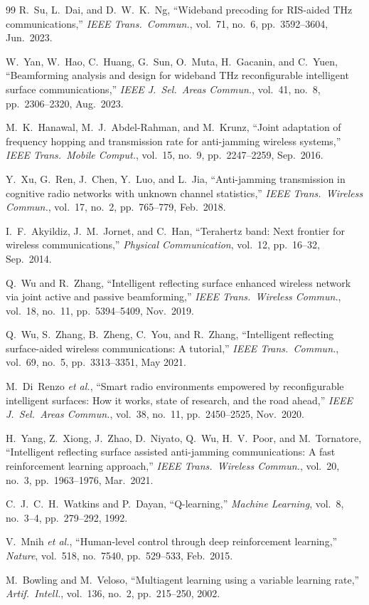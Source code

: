 \documentclass[10pt,conference]{IEEEtran}
\begin{document}
\balance
\begin{thebibliography}{99}
R.~Su, L.~Dai, and D.~W.~K.~Ng,
``Wideband precoding for RIS-aided THz communications,''
\emph{IEEE Trans.\ Commun.}, vol.~71, no.~6, pp.~3592--3604, Jun.\ 2023.

W.~Yan, W.~Hao, C.~Huang, G.~Sun, O.~Muta, H.~Gacanin, and C.~Yuen,
``Beamforming analysis and design for wideband THz reconfigurable intelligent surface communications,''
\emph{IEEE J.\ Sel.\ Areas Commun.}, vol.~41, no.~8, pp.~2306--2320, Aug.\ 2023.

M.~K.~Hanawal, M.~J.~Abdel-Rahman, and M.~Krunz,
``Joint adaptation of frequency hopping and transmission rate for anti-jamming wireless systems,''
\emph{IEEE Trans.\ Mobile Comput.}, vol.~15, no.~9, pp.~2247--2259, Sep.\ 2016.

Y.~Xu, G.~Ren, J.~Chen, Y.~Luo, and L.~Jia,
``Anti-jamming transmission in cognitive radio networks with unknown channel statistics,''
\emph{IEEE Trans.\ Wireless Commun.}, vol.~17, no.~2, pp.~765--779, Feb.\ 2018.

I.~F.~Akyildiz, J.~M.~Jornet, and C.~Han,
``Terahertz band: Next frontier for wireless communications,''
\emph{Physical Communication}, vol.~12, pp.~16--32, Sep.\ 2014.

Q.~Wu and R.~Zhang,
``Intelligent reflecting surface enhanced wireless network via joint active and passive beamforming,''
\emph{IEEE Trans.\ Wireless Commun.}, vol.~18, no.~11, pp.~5394--5409, Nov.\ 2019.

Q.~Wu, S.~Zhang, B.~Zheng, C.~You, and R.~Zhang,
``Intelligent reflecting surface-aided wireless communications: A tutorial,''
\emph{IEEE Trans.\ Commun.}, vol.~69, no.~5, pp.~3313--3351, May 2021.

M.~Di~Renzo \emph{et al.},
``Smart radio environments empowered by reconfigurable intelligent surfaces: How it works, state of research, and the road ahead,''
\emph{IEEE J.\ Sel.\ Areas Commun.}, vol.~38, no.~11, pp.~2450--2525, Nov.\ 2020.

H.~Yang, Z.~Xiong, J.~Zhao, D.~Niyato, Q.~Wu, H.~V.~Poor, and M.~Tornatore,
``Intelligent reflecting surface assisted anti-jamming communications: A fast reinforcement learning approach,''
\emph{IEEE Trans.\ Wireless Commun.}, vol.~20, no.~3, pp.~1963--1976, Mar.\ 2021.

C.~J.~C.~H.~Watkins and P.~Dayan,
``Q-learning,''
\emph{Machine Learning}, vol.~8, no.~3--4, pp.~279--292, 1992.

V.~Mnih \emph{et al.},
``Human-level control through deep reinforcement learning,''
\emph{Nature}, vol.~518, no.~7540, pp.~529--533, Feb.\ 2015.

M.~Bowling and M.~Veloso,
``Multiagent learning using a variable learning rate,''
\emph{Artif.\ Intell.}, vol.~136, no.~2, pp.~215--250, 2002.

\end{thebibliography}
\end{document}
